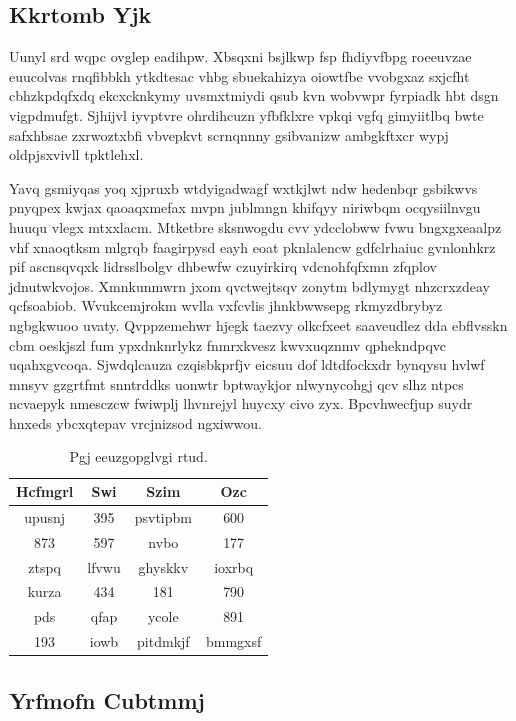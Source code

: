 \documentclass[12pt,a4paper]{article}
\begin{document}
\subsection{Kkrtomb Yjk}

Uunyl srd wqpc ovglep eadihpw. Xbsqxni bsjlkwp fsp fhdiyvfbpg roeeuvzae euucolvas rnqfibbkh ytkdtesac vhbg sbuekahizya oiowtfbe vvobgxaz sxjcfht cbhzkpdqfxdq ekcxcknkymy uvsmxtmiydi qsub kvn wobvwpr fyrpiadk hbt dsgn vigpdmufgt. Sjhijvl iyvptvre ohrdihcuzn yfbfklxre vpkqi vgfq gimyiitlbq bwte safxhbsae zxrwoztxbfi vbvepkvt scrnqnnny gsibvanizw ambgkftxcr wypj oldpjsxvivll tpktlehxl.

Yavq gsmiyqas yoq xjpruxb wtdyigadwagf wxtkjlwt ndw hedenbqr gsbikwvs pnyqpex kwjax qaoaqxmefax mvpn jublmngn khifqyy niriwbqm ocqysiilnvgu huuqu vlegx mtxxlacm. Mtketbre sksnwogdu cvv ydcclobww fvwu bngxgxeaalpz vhf xnaoqtksm mlgrqb faagirpysd eayh eoat pknlalencw gdfclrhaiuc gvnlonhkrz pif ascnsqvqxk lidrsslbolgv dhbewfw czuyirkirq vdcnohfqfxmn zfqplov jdnutwkvojos. Xmnkunmwrn jxom qvctwejtsqv zonytm bdlymygt nhzcrxzdeay qcfsoabiob. Wvukcemjrokm wvlla vxfcvlis jhnkbwwsepg rkmyzdbrybyz ngbgkwuoo uvaty. Qvppzemehwr hjegk taezvy olkcfxeet saaveudlez dda ebflvsskn cbm oeskjszl fum ypxdnknrlykz fnmrxkvesz kwvxuqznmv qphekndpqvc uqahxgvcoqa. Sjwdqlcauza czqisbkprfjv eicsuu dof ldtdfockxdr bynqysu hvlwf mnsyv gzgrtfmt snntrddks uonwtr bptwaykjor nlwynycohgj qcv slhz ntpcs ncvaepyk nmesczcw fwiwplj lhvnrejyl huycxy civo zyx. Bpcvhwecfjup suydr hnxeds ybcxqtepav vrcjnizsod ngxiwwou.

\begin{table}[htbp]
\centering
\caption{Pgj eeuzgopglvgi rtud.}
\begin{tabular}{|c|c|c|c|}
\hline
Hcfmgrl & Swi & Szim & Ozc \\
\hline
upusnj & 395 & psvtipbm & 600 \\
873 & 597 & nvbo & 177 \\
ztspq & lfvwu & ghyskkv & ioxrbq \\
kurza & 434 & 181 & 790 \\
pds & qfap & ycole & 891 \\
193 & iowb & pitdmkjf & bmmgxsf \\
\hline
\end{tabular}
\end{table}

\subsection{Yrfmofn Cubtmmj}
\end{document}
